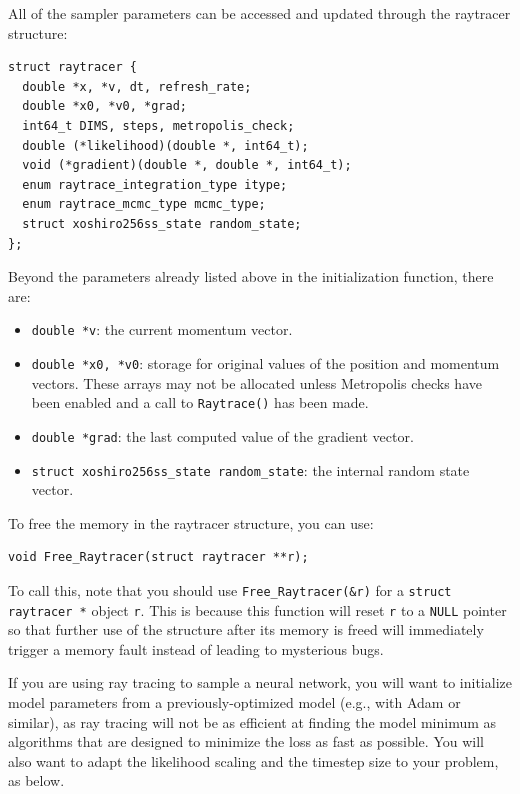 \documentclass[12pt]{article}
\begin{document}
All of the sampler parameters can be accessed and updated through the raytracer structure:
\begin{lstlisting}
struct raytracer {
  double *x, *v, dt, refresh_rate;
  double *x0, *v0, *grad;
  int64_t DIMS, steps, metropolis_check;
  double (*likelihood)(double *, int64_t);
  void (*gradient)(double *, double *, int64_t);
  enum raytrace_integration_type itype;
  enum raytrace_mcmc_type mcmc_type;
  struct xoshiro256ss_state random_state;
};
\end{lstlisting}
Beyond the parameters already listed above in the initialization function, there are:
\begin{itemize}
\item \lstinline{double *v}: the current momentum vector.
\item \lstinline{double *x0, *v0}: storage for original values of the position and momentum vectors.  These arrays may not be allocated unless Metropolis checks have been enabled and a call to \lstinline{Raytrace()} has been made.
\item \lstinline{double *grad}: the last computed value of the gradient vector.
\item \lstinline{struct xoshiro256ss_state random_state}: the internal random state vector.
\end{itemize}

To free the memory in the raytracer structure, you can use:
\begin{lstlisting}
void Free_Raytracer(struct raytracer **r);
\end{lstlisting}
To call this, note that you should use \lstinline{Free_Raytracer(&r)} for a \lstinline{struct raytracer *} object \lstinline{r}.   This is because this function will reset \lstinline{r} to a \lstinline{NULL} pointer so that further use of the structure after its memory is freed will immediately trigger a memory fault instead of leading to mysterious bugs.

If you are using ray tracing to sample a neural network, you will want to initialize model parameters from a previously-optimized model (e.g., with Adam or similar), as ray tracing will not be as efficient at finding the model minimum as algorithms that are designed to minimize the loss as fast as possible.  You will also want to adapt the likelihood scaling and the timestep size to your problem, as below.
\end{document}
